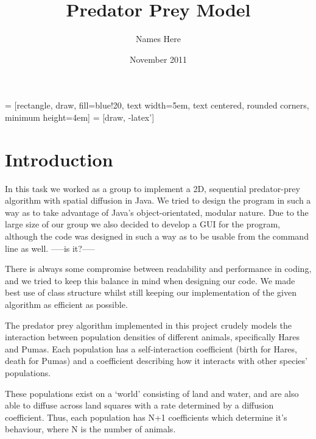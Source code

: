 \documentclass[11pt]{report}
\title{Predator Prey Model}
\author{Names Here}
\date{November 2011}
\begin{document}
\usetikzlibrary{shapes,arrows}


 = [rectangle, draw, fill=blue!20, 
    text width=5em, text centered, rounded corners, minimum height=4em]
 = [draw, -latex']

\maketitle

\begin{abstract}
\end{abstract}

\tableofcontents

\chapter{Introduction}


In this task we worked as a group to implement a 2D, sequential predator-prey algorithm with spatial diffusion
in Java. We tried to design the program in such a way as to take advantage of Java's object-orientated, modular nature. 
Due to the large size of our group we also decided to develop a GUI for the program, although the code was designed 
in such a way as to be usable from the command line as well. -----is it?-----\newline{}

There is always some compromise between readability and performance in coding, and we tried to keep this balance in mind
when designing our code. We made best use of class structure whilst still keeping our implementation of the given 
algorithm as efficient as possible.\newline{}

The predator prey algorithm implemented in this project crudely models the interaction between population densities of different animals, specifically Hares and Pumas. Each population has a self-interaction coefficient (birth for Hares, death for Pumas) and a coefficient describing how it interacts with other species' populations. \newline{}

These populations exist on a `world' consisting of land and water, and are also able to diffuse across land squares with a rate determined by a diffusion coefficient. Thus, each population has N+1 coefficients which determine it's behaviour, where N is the number of animals.
\end{document}
